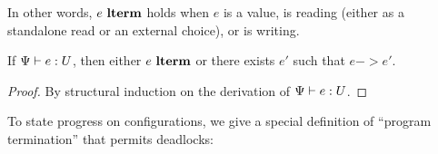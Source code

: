 In other words, $e~\textbf{lterm}$ holds when $e$ is a value, is reading (either as a
standalone read or an external choice), or is writing.

\begin{lemma}
  If $\Psi |- e : U$, then either $e~\textbf{lterm}$
  or there exists $e'$ such that $e -> e'$.
  \begin{proof}
    By structural induction on the derivation of $\Psi |- e : U$.
  \end{proof}
\end{lemma}

To state progress on configurations, we give a special definition of ``program
termination'' that permits deadlocks:\smallskip

